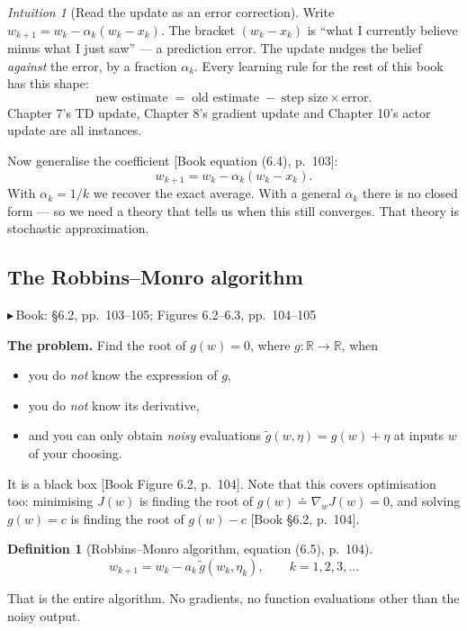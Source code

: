 \documentclass[11pt, letterpaper]{article}
\theoremstyle{runin}
\newtheorem*{definition}{Definition}
\theoremstyle{runinplain}
\theoremstyle{remark}
\newtheorem*{intuition}{Intuition}
\newcommand{\R}{\mathbb{R}}
\newcommand{\bk}[1]{{\color{bookblue}\small$\blacktriangleright$\,\textsf{Book: #1}}}
\newcommand{\bkin}[1]{{\color{bookblue}\small[\textsf{Book #1}]}}
\begin{document}
\begin{intuition}[Read the update as an error correction]
Write $w_{k+1}=w_k-\alpha_k(w_k-x_k)$. The bracket $(w_k-x_k)$ is
``what I currently believe minus what I just saw'' --- a prediction error. The
update nudges the belief \emph{against} the error, by a fraction $\alpha_k$. Every
learning rule for the rest of this book has this shape:
\[
  \text{new estimate} \;=\; \text{old estimate} \;-\; \text{step size}\times\text{error}.
\]
Chapter 7's TD update, Chapter 8's gradient update and Chapter 10's actor update
are all instances.
\end{intuition}

Now generalise the coefficient \bkin{equation (6.4), p.~103}:
\[
  w_{k+1}=w_k-\alpha_k(w_k-x_k).
\]
With $\alpha_k=1/k$ we recover the exact average. With a general $\alpha_k$ there is
no closed form --- so we need a theory that tells us when this still converges.
That theory is stochastic approximation.

\subsection{The Robbins--Monro algorithm}

\bk{\S6.2, pp.~103--105; Figures 6.2--6.3, pp.~104--105}

\textbf{The problem.} Find the root of $g(w)=0$, where $g:\R\to\R$, when

\begin{itemize}
  \item you do \emph{not} know the expression of $g$,
  \item you do \emph{not} know its derivative,
  \item and you can only obtain \emph{noisy} evaluations
        $\tilde g(w,\eta)=g(w)+\eta$ at inputs $w$ of your choosing.
\end{itemize}

It is a black box \bkin{Figure 6.2, p.~104}. Note that this covers optimisation too:
minimising $J(w)$ is finding the root of $g(w)\doteq\nabla_wJ(w)=0$, and solving
$g(w)=c$ is finding the root of $g(w)-c$ \bkin{\S6.2, p.~104}.

\begin{definition}[Robbins--Monro algorithm, equation (6.5), p.~104]
\[
  \boxed{\;w_{k+1}=w_k-a_k\,\tilde g(w_k,\eta_k),\qquad k=1,2,3,\dots\;}
\]
\end{definition}

That is the entire algorithm. No gradients, no function evaluations other than the
noisy output.
\end{document}
